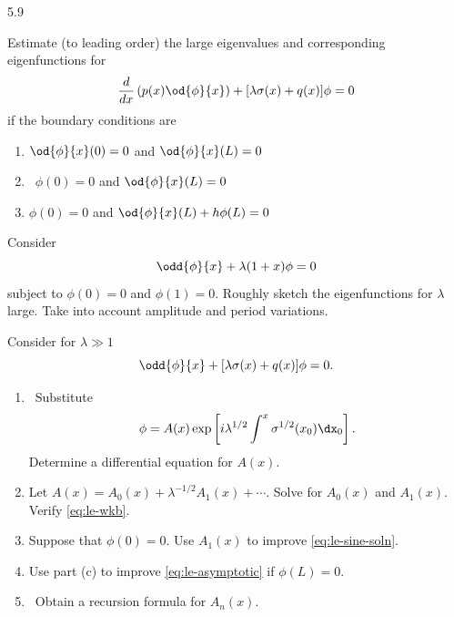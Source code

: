 \begin{exercises}{5.9}

\item Estimate (to leading order) the large eigenvalues and corresponding eigenfunctions for
\[
\frac{d}{d x}\left(p(x)\od{\phi}{x}\right) + [\lambda\sigma(x) + q(x)]\phi = 0
\]
if the boundary conditions are
\begin{enumerate}
\item $\displaystyle\od{\phi}{x}(0) = 0$ and $\displaystyle\od{\phi}{x}(L) = 0$
\item\starred\ $\phi(0) = 0$ and $\displaystyle\od{\phi}{x}(L) = 0$
\item $\phi(0) = 0$ and $\displaystyle\od{\phi}{x}(L) + h\phi(L) = 0$
\end{enumerate}

\item Consider
\[
\odd{\phi}{x} + \lambda(1+x)\phi = 0
\]
subject to $\phi(0) = 0$ and $\phi(1) = 0$.  Roughly sketch the eigenfunctions for $\lambda$ large.  Take into account amplitude and period variations.

\item Consider for $\lambda \gg 1$
\[
\odd{\phi}{x} + [\lambda\sigma(x) + q(x)]\phi = 0.
\]
\begin{enumerate}
\item\starred\ Substitute
\[
\phi = A(x)\exp\left[i\lambda^{1/2}\int^x \sigma^{1/2}(x_0)\dx_0\right].
\]
Determine a differential equation for $A(x)$.
\item Let $A(x) = A_0(x) + \lambda^{-1/2}A_1(x) + \cdots$.  Solve for $A_0(x)$ and $A_1(x)$.  Verify \eqref{eq:le-wkb}.
\item Suppose that $\phi(0) = 0$.  Use $A_1(x)$ to improve \eqref{eq:le-sine-soln}.
\item Use part (c) to improve \eqref{eq:le-asymptotic} if $\phi(L) = 0$.
\item\starred\ Obtain a recursion formula for $A_n(x)$.
\end{enumerate}

\end{exercises}
